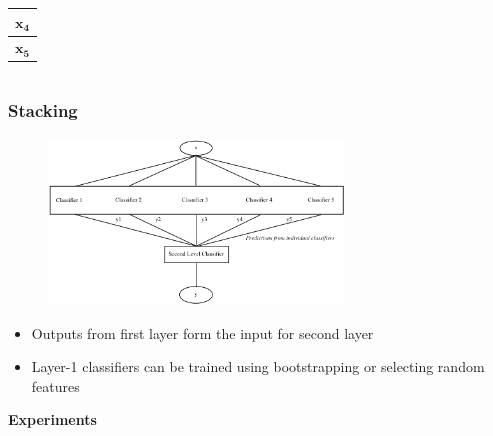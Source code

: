 \documentclass[xcolor=table]{beamer}
\begin{document}
\begin{frame}
\begin{columns}
{\begin{column}{0.3\textwidth}
\begin{center}
\begin{tabular}{| c |}
                            \hline
                            \cellcolor{gray!50}$\mathbf{x_4}$\\
                            \hline
                            \cellcolor{gray!80}$\mathbf{x_5}$\\
                            \hline
                        \end{tabular}
                    \end{center}
                \end{column}
            }
        \end{columns}
    \end{frame}
    
    \begin{frame}
        \frametitle{Stacking}
        \begin{figure}
            \centering
            \includegraphics[width=0.7\textwidth]{figures/stacking_prediction_flow.png}
        \end{figure}
        \begin{itemize}
            \item{Outputs from first layer form the input for second layer}
            \item{Layer-1 classifiers can be trained using bootstrapping or selecting random features}
        \end{itemize}
    \end{frame}
    
    \begin{frame}
        \begin{center}
            \textbf{Experiments}
        \end{center}
    \end{frame}
    
\end{document}
